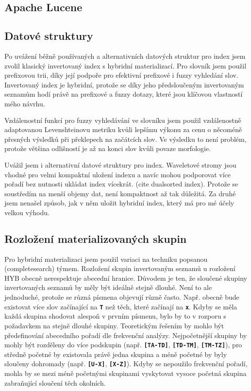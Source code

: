 \documentclass[12pt,letterpaper,oneside,openright]{book}
\newcommand{\bftt}[1]{\texttt{\textbf{#1}}}
\begin{document}
\subsection{Apache Lucene}


\subsection{Datové struktury}
Po uvážení běžně používaných a alternativních datových struktur pro index jsem
zvolil klasický invertovaný index s hybridní materializací. Pro slovník jsem
použil prefixovou trii, díky její podpoře pro efektivní prefixové i fuzzy
vyhledání slov. Invertovaný index je hybridní, protože se díky jeho
předsloučeným invertovaným seznamům hodí právě na prefixové a fuzzy dotazy,
které jsou klíčovou vlastností mého návrhu.

Vzdálenostní funkcí pro fuzzy vyhledávání ve slovníku jsem použil vzdálenostně
adaptovanou Levenshteinovu metriku kvůli lepšímu výkonu za cenu o něcoméně
přesných výsledků při překlepech na začátcích slov. Ve výsledku to není
problém, protože většina odlišností je až na konci slov kvůli povaze
morfologie.

Uvážil jsem i alternativní datové struktury pro index. Waveletové stromy jsou
vhodné pro velmi kompaktní uložení indexu a navíc mohou podporovat více pořadí
bez nutnosti ukládat index vícekrát. (cite dualsorted index). Protože se
soustředím na menší objemy dat, není kompaktnost až tak důležitá. Za druhé jsem
nenašel způsob, jak v něm uložit hybridní index, který má pro mé účely velkou
výhodu.

\subsection{Rozložení materializovaných skupin}
Pro hybridní materializaci jsem použil variaci na techniku popsanou
(completesearch) týmem. Rozložení skupin invertovaným seznamů u rozložení HYB
obecně nerespektuje abecední hranice. Důvodem je ten, že sloučené skupiny
invertovaných seznamů by měly být ideálně stejně dlouhé. Není to ale
jednoduché, protože se různá písmena objevují různě často. Např. obecně bude
existovat více slov začínající na \bftt{T} než těch, které začínají na
\bftt{x}. Kdyby se měla každá skupina shodovat alespoň v prvním písmenu, bylo
by to v rozporu s požadavkem na stejně dlouhé skupiny. Teoretickým řešením by
mohlo být předefinování abecedního pořadí dle frekvenční analýzy. Nejpočetnější
skupiny by mohly být rozděleny do více podskupin (např. \bftt{[TA-TD]},
\bftt{[TD-TM]}, \bftt{[TM-TZ]}), pro středně početné by existovala právě jedna
skupina a méně početné by byly sloučeny dohromady (např. \bftt{[U-X]},
\bftt{[X-Z]}). Kdyby se nepoužilo frekvenční pořadí, mohla by se mezi méně
početnými skupinami vyskytovat vysoce početná skupina zabraňující sloučení těch
okolních.
\end{document}
